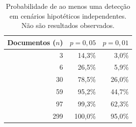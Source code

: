\begin{table}[htbp]\centering\small
\caption{Probabilidade de ao menos uma detecção em cenários hipotéticos independentes. Não são resultados observados.}
\begin{tabular}{rrr}\toprule
Documentos ($n$) & $p=0{,}05$ & $p=0{,}01$ \\\midrule
3 & 14,3\% & 3,0\% \\
6 & 26,5\% & 5,9\% \\
30 & 78,5\% & 26,0\% \\
59 & 95,2\% & 44,7\% \\
97 & 99,3\% & 62,3\% \\
299 & 100,0\% & 95,0\% \\
\bottomrule\end{tabular}
\end{table}